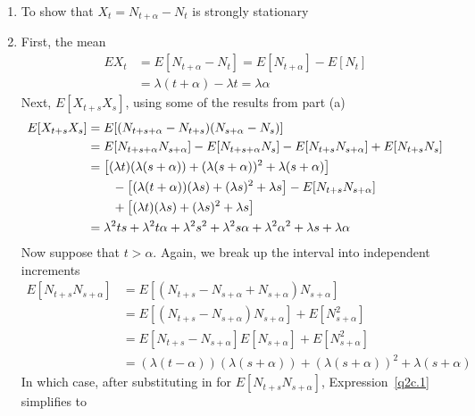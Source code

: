 \documentclass[12pt]{article}
\theoremstyle{plain}
\theoremstyle{definition}
\theoremstyle{remark}
\begin{document}
\begin{enumerate}
\begin{enumerate}
      \item %
        To show that $X_t = N_{t+\alpha}-N_t$ is strongly stationary

      \item %
        First, the mean
        \begin{align*}
          EX_t &= E[N_{t+\alpha} - N_t]
            = E[N_{t+\alpha}] - E[N_t]\\
            &= \lambda(t+\alpha) - \lambda t = \lambda \alpha
        \end{align*}
        Next, $E[X_{t+s} X_s]$, using some of the results from part (a)
        \begin{align}
          E[X_{t+s} X_s]
          &= E[(N_{t+s+\alpha}-N_{t+s})(N_{s+\alpha}-N_s)]\notag\\
          &= E[N_{t+s+\alpha} N_{s+\alpha}]
            - E[N_{t+s+\alpha}N_s]
            - E[N_{t+s}N_{s+\alpha}]
            + E[N_{t+s}N_s]\notag\\
          &= \left[(\lambda t)(\lambda(s+\alpha)) + (\lambda(s+\alpha))^2
            + \lambda (s+\alpha)\right]\notag\\
            & \qquad - \left[(\lambda(t+\alpha))(\lambda s)
               + (\lambda s)^2 + \lambda s\right]
            - E[N_{t+s}N_{s+\alpha}] \notag \\
          &\qquad + \left[(\lambda t)(\lambda s) +
              (\lambda s)^2 + \lambda s\right]\notag\\
          &= \lambda^2 ts + \lambda^2 t\alpha + \lambda^2 s^2
            + \lambda^2 s\alpha + \lambda^2 \alpha^2 + \lambda s
            +\lambda \alpha
            \label{q2c.1}
        \end{align}
        Now suppose that $t>\alpha$. Again, we break up the interval
        into independent increments
        \begin{align*}
          E[N_{t+s}N_{s+\alpha}]
            &= E[(N_{t+s} - N_{s+\alpha} + N_{s+\alpha})N_{s+\alpha}]\\
            &= E[(N_{t+s} - N_{s+\alpha})N_{s+\alpha}]
              + E[N^2_{s+\alpha}]\\
            &= E[N_{t+s} - N_{s+\alpha}]E[N_{s+\alpha}]
              + E[N^2_{s+\alpha}]\\
            &= (\lambda(t-\alpha)) (\lambda (s+\alpha))
              + (\lambda(s+\alpha))^2 + \lambda (s+\alpha)
        \end{align*}
        In which case, after substituting in for
        $E[N_{t+s}N_{s+\alpha}]$, Expression~\ref{q2c.1} simplifies to

\end{enumerate}
\end{enumerate}
\end{document}
